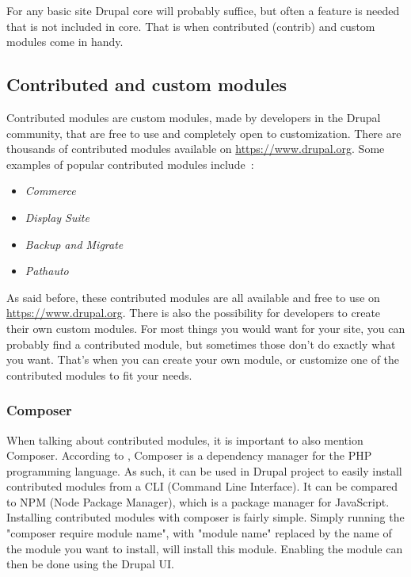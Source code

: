 For any basic site Drupal core will probably suffice, but often a feature is needed that is not included in core. That is when contributed (contrib) and custom modules come in handy.


\subsection{Contributed and custom modules}

Contributed modules are custom modules, made by developers in the Drupal community, that are free to use and completely open to customization. There are thousands of contributed modules available on \url{https://www.drupal.org}. Some examples of popular contributed modules include~\autocite{Tomlinson2015}: 

\begin{itemize}
	\item  \emph{Commerce}
	\item  \emph{Display Suite}
	\item  \emph{Backup and Migrate}
	\item  \emph{Pathauto}
\end{itemize}

As said before, these contributed modules are all available and free to use on \url{https://www.drupal.org}. There is also the possibility for developers to create their own custom modules. For most things you would want for your site, you can probably find a contributed module, but sometimes those don't do exactly what you want. That's when you can create your own module, or customize one of the contributed modules to fit your needs.

\subsubsection{Composer}
\label{sss:composer}

When talking about contributed modules, it is important to also mention \gls{Composer}. According to \textcite{M.Kromann2018}, Composer is a dependency manager for the PHP programming language. As such, it can be used in Drupal project to easily install contributed modules from a \gls{CLI} (Command Line Interface). It can be compared to \gls{NPM} (Node Package Manager), which is a package manager for JavaScript. Installing contributed modules with composer is fairly simple. Simply running the "composer require {module name}", with "{module name}" replaced by the name of the module you want to install, will install this module. Enabling the module can then be done using the Drupal UI.

